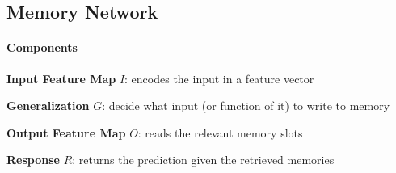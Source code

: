 \documentclass[10pt]{report}
\begin{document}
\subsection{Memory Network}
\paragraph{Components}\begin{list}{}{}
	\item \textbf{Input Feature Map} $I$: encodes the input in a feature vector
	\item \textbf{Generalization} $G$: decide what input (or function of it) to write to memory
	\item \textbf{Output Feature Map} $O$: reads the relevant memory slots
	\item \textbf{Response} $R$: returns the prediction given the retrieved memories
\end{list}
\pagebreak
\end{document}
